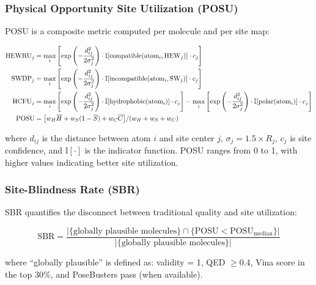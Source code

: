 \documentclass[journal=jcisd,manuscript=article]{achemso}
\begin{document}
\subsubsection{Physical Opportunity Site Utilization (POSU)}

POSU is a composite metric computed per molecule and per site map:

\begin{align}
\text{HEWRU}_j &= \max_i \left[ \exp\left(-\frac{d_{ij}^2}{2\sigma_j^2}\right)
                \cdot \mathbb{I}[\text{compatible}(\text{atom}_i, \text{HEW}_j)] \cdot c_j \right] \\
\text{SWDP}_j  &= \max_i \left[ \exp\left(-\frac{d_{ij}^2}{2\sigma_j^2}\right)
                \cdot \mathbb{I}[\text{incompatible}(\text{atom}_i, \text{SW}_j)] \cdot c_j \right] \\
\text{HCFU}_j  &= \max_i \left[ \exp\left(-\frac{d_{ij}^2}{2\sigma_j^2}\right)
                \cdot \mathbb{I}[\text{hydrophobic}(\text{atom}_i)] \cdot c_j \right]
                - \max_i \left[ \exp\left(-\frac{d_{ij}^2}{2\sigma_j^2}\right)
                \cdot \mathbb{I}[\text{polar}(\text{atom}_i)] \cdot c_j \right] \\
\text{POSU}    &= \bigl[ w_H \overline{H} + w_S(1 - \overline{S}) + w_C \overline{C} \bigr] / (w_H + w_S + w_C) \notag
\end{align}

where $d_{ij}$ is the distance between atom $i$ and site center $j$,
$\sigma_j = 1.5 \times R_j$, $c_j$ is site confidence,
and $\mathbb{I}[\cdot]$ is the indicator function. POSU ranges from
0 to 1, with higher values indicating better site utilization.

\subsubsection{Site-Blindness Rate (SBR)}

SBR quantifies the disconnect between traditional quality and site utilization:

\begin{equation}
\text{SBR} = \frac{|\{\text{globally plausible molecules}\} \cap \{\text{POSU} < \text{POSU}_{\text{median}}\}|}
                 {|\{\text{globally plausible molecules}\}|}
\end{equation}

where ``globally plausible'' is defined as: validity = 1, QED $\geq 0.4$,
Vina score in the top 30\%, and PoseBusters pass (when available).
\end{document}
